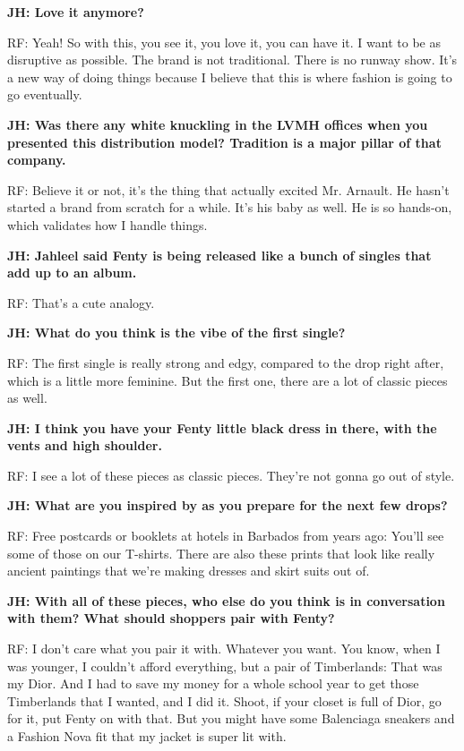 \textbf{JH: Love it anymore?}

RF: Yeah! So with this, you see it, you love it, you can have it. I want
to be as disruptive as possible. The brand is not traditional. There is
no runway show. It's a new way of doing things because I believe that
this is where fashion is going to go eventually.

\textbf{JH: Was there any white knuckling in the LVMH offices when you
presented this distribution model? Tradition is a major pillar of that
company.}

RF: Believe it or not, it's the thing that actually excited Mr. Arnault.
He hasn't started a brand from scratch for a while. It's his baby as
well. He is so hands-on, which validates how I handle things.

\textbf{JH: Jahleel said Fenty is being released like a bunch of singles
that add up to an album.}

RF: That's a cute analogy.

\textbf{JH: What do you think is the vibe of the first single?}

RF: The first single is really strong and edgy, compared to the drop
right after, which is a little more feminine. But the first one, there
are a lot of classic pieces as well.

\textbf{JH: I think you have your Fenty little black dress in there,
with the vents and high shoulder.}

RF: I see a lot of these pieces as classic pieces. They're not gonna go
out of style.

\textbf{JH: What are you inspired by as you prepare for the next few
drops?}

RF: Free postcards or booklets at hotels in Barbados from years ago:
You'll see some of those on our T-shirts. There are also these prints
that look like really ancient paintings that we're making dresses and
skirt suits out of.

\textbf{JH: With all of these pieces, who else do you think is in
conversation with them? What should shoppers pair with Fenty?}

RF: I don't care what you pair it with. Whatever you want. You know,
when I was younger, I couldn't afford everything, but a pair of
Timberlands: That was my Dior. And I had to save my money for a whole
school year to get those Timberlands that I wanted, and I did it. Shoot,
if your closet is full of Dior, go for it, put Fenty on with that. But
you might have some Balenciaga sneakers and a Fashion Nova fit that my
jacket is super lit with.

